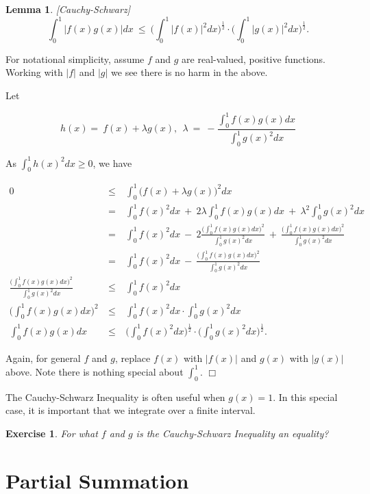 \documentclass[12pt,letterpaper]{report}
\newcommand\be{\begin{equation}}
\newcommand\ee{\end{equation}}
\newcommand\bea{\begin{eqnarray}}
\newcommand\eea{\end{eqnarray}}
\newcommand{\foh}{\frac{1}{2}}  %
\newtheorem{lem}[thm]{Lemma}
\newtheorem{exe}[thm]{Exercise}
\begin{document}
\begin{lem}\label{lemcauchyshwarz}[Cauchy-Schwarz]
\be \int_0^1 |f(x)g(x)|dx \ \le \ \Big( \int_0^1 |f(x)|^2dx
\Big)^\foh \cdot \Big( \int_0^1 |g(x)|^2 dx\Big)^\foh. \ee
\end{lem}

For notational simplicity, assume $f$ and $g$ are real-valued,
positive functions. Working with $|f|$ and $|g|$ we see there is
no harm in the above.

Let

\be h(x) = \ f(x) + \lambda g(x), \ \ \lambda \ = \
-\frac{\int_0^1 f(x)g(x)dx}{\int_0^1 g(x)^2 dx} \ee

As $\int_0^1 h(x)^2 dx \ge 0$, we have

\bea 0 & \ \le \ & \int_0^1 \Big( f(x) + \lambda g(x) \Big)^2dx
\nonumber\\ & \ = \ & \int_0^1 f(x)^2 dx \ + \ 2\lambda \int_0^1
f(x) g(x) dx \ + \ \lambda^2 \int_0^1 g(x)^2 dx \nonumber\\ & \ =
\ & \int_0^1 f(x)^2 dx \ - \ 2 \frac{\Big( \int_0^1 f(x)g(x)dx
\Big)^2}{\int_0^1 g(x)^2 dx} \ + \ \frac{\Big( \int_0^1 f(x)g(x)dx
\Big)^2}{\int_0^1 g(x)^2 dx} \nonumber\\ & \ = \ & \int_0^1 f(x)^2
dx \ - \ \frac{\Big( \int_0^1 f(x)g(x)dx \Big)^2}{\int_0^1 g(x)^2
dx} \nonumber\\ \frac{\Big( \int_0^1 f(x)g(x)dx \Big)^2}{\int_0^1
g(x)^2 dx} & \ \le \ & \int_0^1 f(x)^2 dx \nonumber\\ \Big(
\int_0^1 f(x)g(x)dx \Big)^2 & \ \le \ & \int_0^1 f(x)^2 dx  \cdot
\int_0^1 g(x)^2 dx \nonumber\\ \int_0^1 f(x)g(x)dx & \ \le \ &
\Big( \int_0^1 f(x)^2 dx \Big)^\foh \cdot \Big( \int_0^1 g(x)^2 dx
\Big)^\foh. \eea

Again, for general $f$ and $g$, replace $f(x)$ with $|f(x)|$ and
$g(x)$ with $|g(x)|$ above. Note there is nothing special about
$\int_0^1$. $\Box$

The Cauchy-Schwarz Inequality is often useful when $g(x) = 1$. In
this special case, it is important that we integrate over a finite
interval.

\begin{exe} For what $f$ and $g$ is the Cauchy-Schwarz Inequality
an equality? \end{exe}

\section{Partial Summation}
\end{document}
